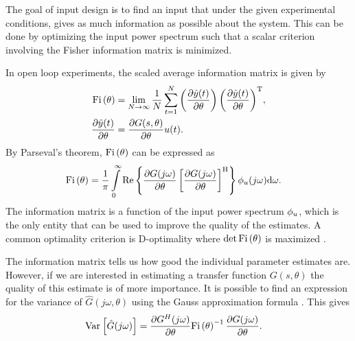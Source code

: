 The goal of input design is to find an input that under the given experimental conditions, gives as much information as possible about the system.
This can be done by optimizing the input power spectrum such that  a scalar criterion involving the Fisher information matrix is minimized.

In open loop experiments, the scaled average information matrix is given by
\begin{align}
\mathrm{Fi} \left(\theta\right) & = \lim_{N\rightarrow\infty}
          \frac{1}{N}
            \sum_{t=1}^{N}
              {\left(\frac{\partial\hat{y}(t)}{\partial\theta}\right)
               \left(\frac{\partial\hat{y}(t)}{\partial\theta}\right)^{\mathrm{T}}},\\
\frac{\partial\hat{y}(t)}{\partial\theta}
    & =\frac{\partial G(s,\theta)}{\partial \theta}u(t).
\end{align}
By Parseval's theorem, $\mathrm{Fi} \left(\theta\right)$ can be expressed as
\begin{align}
\mathrm{Fi} \left(\theta\right) &= \frac{1}{\pi}
         \int\limits_0^\infty \mathrm{Re}
           \left\{      \frac{\partial G(j\omega)}{\partial \theta}
                  \left[\frac{\partial G(j\omega)}{\partial \theta}\right]^{\mathrm{H}}
           \right\}
           \phi_{u}(j\omega)
           \mathrm{d}{\omega} \text{.}
\label{eq:excitation:IF}
\end{align}
The information matrix is a function of the input power spectrum $\phi_{u}$, which is the only entity that can be used to improve the quality of the estimates. A common optimality criterion is D-optimality where $\det{\ensuremath{\mathrm{Fi} \left(\theta\right)}}$ is maximized \citep{Goodwin1977}.

The information matrix tells us how good the individual parameter estimates are. However, if we are interested in estimating a transfer function $G(s,\theta)$ the quality of this estimate is of more importance. It is possible to find an expression for the variance of $\hat{G}(j\omega,\theta)$ using the Gauss approximation formula \citep{Ljung1999, Pintelon2012}. This gives
\begin{align}
\operatorname{\mathrm{Var}}_{} \left[ \hat{G}(j\omega) \right] &= \frac{\partial G^H(j\omega)}{\partial \theta}\mathrm{Fi} \left(\theta\right)^{-1}\frac{\partial G(j\omega)}{\partial \theta}.
\label{eq:excitation:varG}
\end{align}

